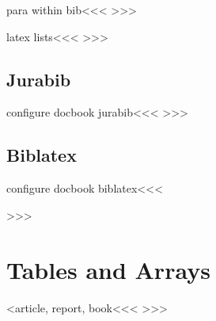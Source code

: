 \<para within bib\><<<
>>>



\<latex lists\><<<
\LinkCommand{}
>>>


\subsection{Jurabib}


\<configure docbook jurabib\><<<
>>>

\subsection{Biblatex}


\<configure docbook biblatex\><<<
    \def\bibConfigure{%
  \ConfigureList{thebibliography}
  {\ifvmode \IgnorePar \fi \EndP \EndP
    \HCode {<bibliolist>}%
%
%
%
%
  \immediate\write\@auxout{%
      \string\BibFileName[\therefsection]{\FileName}}%
%
%
    \PushMacro \end:itm \global \let \end:itm =\empty}%
  {\ifvmode \IgnorePar \fi \EndP
    \PopMacro \end:itm \global \let \end:itm \end:itm \EndP
    \HCode {</bibliomisc></bibliomixed></bibliolist>}\ShowPar}%
  {\ifvmode \IgnorePar \fi \EndP \gHAdvance \bibN by 1
    \end:itm \global \def \end:itm {\EndP \HCode{</bibliomisc></bibliomixed>}}%
    \HCode {<bibliomixed xml:id="X\therefsection-\abx@field@entrykey"><bibliomisc>}\bgroup \bf}%
  {\ifvmode \IgnorePar \fi \EndP
    \egroup
    \HCode {</bibliomisc><bibliomisc\Hnewline xml:id="bib-\bibN">}%
    \par \ShowPar}%
 }

\def\hyper:natanchorstart#1{\Link{}{#1}\EndLink}%
\def\hyper:natlinkstart#1{\Link{#1}{}}%
>>>



\section{Tables and Arrays}

\<<article, report, book\><<<
   {\ifvmode \IgnorePar\fi \EndP
    }
   {\ifvmode \IgnorePar\fi \EndP
    }
   {}{}
>>>

